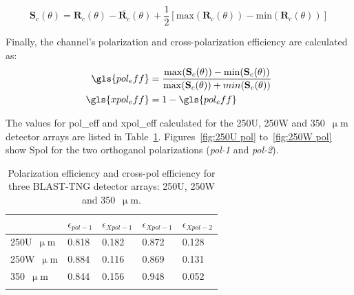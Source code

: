 \begin{equation}
  \mathbf{S}_{c}(\theta) = \mathbf{R}_{c}(\theta) - \overline{\mathbf{R}_{c}}(\theta) + \frac{1}{2} \left[ \mathrm{max}\left( \mathbf{R}_{c}(\theta) \right) - \mathrm{min}\left( \mathbf{R}_{c}(\theta) \right) \right]
\end{equation}

Finally, the channel's polarization and cross-polarization efficiency are calculated as:
\begin{equation}
  \begin{aligned}
   \gls{pol_eff} &= \frac{ \mathrm{max}(\mathbf{S}_{c}(\theta)) - \mathrm{min}(\mathbf{S}_{c}(\theta)) }{ \mathrm{max}(\mathbf{S}_{c}(\theta)) + min(\mathbf{S}_{c}(\theta))} \\
   \gls{xpol_eff} &= 1 - \gls{pol_eff}
 \end{aligned}
\end{equation}

The values for \gls{pol_eff} and \gls{xpol_eff} calculated for the 250U, 250W and 350~$\upmu$m detector arrays are listed in Table~\ref{table:pol eff}. Figures~\ref{fig:250U pol} to~\ref{fig:250W pol} show \gls{Spol} for the two orthoganol polarizations (\textit{pol-1} and \textit{pol-2}).

\begin{table}[!htbp]
\centering
\begin{tabular}{@{}lllll@{}}
\dtoprule{}
 & $\epsilon_{pol-1}$ & $\epsilon_{Xpol-1}$ & $\epsilon_{Xpol-1}$ & $\epsilon_{Xpol-2}$ \\ \midrule
250U~$\upmu$m & 0.818 & 0.182 & 0.872 & 0.128 \\
250W~$\upmu$m & 0.884 & 0.116 & 0.869 & 0.131 \\
350~$\upmu$m & 0.844 & 0.156 & 0.948 & 0.052 \\ \dbottomrule{}
\\
\end{tabular}
\caption{Polarization efficiency  and cross-pol efficiency  for three BLAST-TNG detector arrays: 250U, 250W and 350~$\upmu$m.}
\label{table:pol eff}
\end{table}

